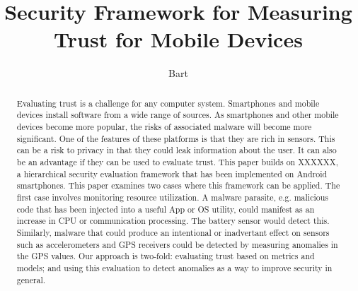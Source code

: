 \documentclass{IEEEtran}
\newcommand{\eat}[1]{}
\newcommand{\sysname}{XXXXXX}
\begin{document}
\title{Security Framework for Measuring Trust for Mobile Devices}
\author{Bart}

\maketitle


\begin{abstract}
Evaluating trust
 is a challenge for any computer system.  Smartphones and mobile devices install software from a 
wide range of sources.  As smartphones and other mobile devices become
more popular, the risks of associated malware will become more significant.
One of the features of these platforms is that they are rich in
sensors.  This can be a risk to privacy in that they could leak information about the user.  It can also be an
advantage if they can be used to evaluate trust.
This paper builds on  \sysname,  a hierarchical security evaluation framework 
that has been implemented on Android smartphones.
This paper examines two cases where this framework can be applied.  
The first case involves monitoring resource utilization.  A malware parasite, e.g. malicious code 
that has been injected into a useful App or OS utility,
could manifest as an increase in CPU or communication processing.
The battery sensor would detect this.  
Similarly, malware that could produce an intentional or inadvertant effect on sensors such as accelerometers
and GPS receivers could be detected
by measuring anomalies in the GPS values.
Our approach is two-fold: evaluating trust based on metrics and models; and 
using this evaluation to detect anomalies as a way to improve security in general.


\eat{For many people, smartphones and other mobile devices serve as a technical interface to the modern world.
These smart devices have embedded on-board sensors, such as accelerometers, gyroscopes, GPS sensors, and
cameras, which are very useful.

This work describes \sysname, a hierarchical framework for checking consistency of sensors 
from multiple devices.  In addition, it relies on Blursense, a dynamic, fine-grained, flexible access
control mechanism, acting as a line of defense that allows users to define and addprivacy filters. 
As a result, the user can expose filtered sensor data to untrusted apps, and researchers can collect 
data in a way that safeguards users' privacy.}  %
\end{abstract}
\end{document}
